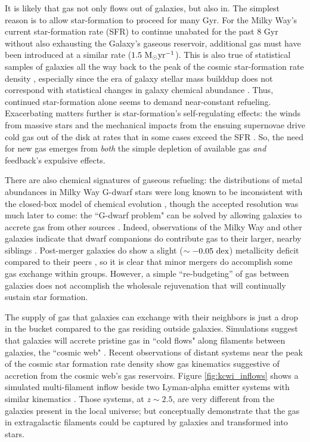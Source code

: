 It is likely that gas not only flows out of galaxies, but also in. The simplest reason is to allow star-formation to proceed for many Gyr. For the Milky Way's current star-formation rate (SFR) to continue unabated for the past 8 Gyr without also exhausting the Galaxy's gaseous reservoir, additional gas must have been introduced at a similar rate ($1.5 ~ {\rm M_{\odot} yr^{-1}}$). This is also true of statistical samples of galaxies all the way back to the peak of the cosmic star-formation rate density \citep{tacconi_2013}, especially since the era of galaxy stellar mass builddup does not correspond with statistical changes in galaxy chemical abundance \citep{erb_06_mzr-z2}. Thus, continued star-formation alone seems to demand near-constant refueling. Exacerbating matters further is star-formation's self-regulating effects: the winds from massive stars and the mechanical impacts from the ensuing supernovae drive cold gas out of the disk at rates that in some cases exceed the SFR \citep{chisholm_18_outflows, roberts-borsani_20_outflows}. So, the need for new gas emerges from \textit{both} the simple depletion of available gas \textit{and} feedback's expulsive effects.

There are also chemical signatures of gaseous refueling: the distributions of metal abundances in Milky Way G-dwarf stars were long known to be inconsistent with the closed-box model of chemical evolution \citep{vandenbergh_62_gdwarf}, though the accepted resolution was much later to come: the ``G-dwarf problem" can be solved by allowing galaxies to accrete gas from other sources \citep{fraternali_07}. Indeed, observations of the Milky Way and other galaxies indicate that dwarf companions do contribute gas to their larger, nearby siblings \citep{martinez-delgado_2010}. Post-merger galaxies do show a slight ($\sim -0.05 ~ {\rm dex}$) metallicity deficit compared to their peers \citep{bustamante_20_mergers}, so it is clear that minor mergers do accomplish some gas exchange within groups. However, a simple ``re-budgeting'' of gas between galaxies does not accomplish the wholesale rejuvenation that will continually sustain star formation.

The supply of gas that galaxies can exchange with their neighbors is just a drop in the bucket compared to the gas residing outside galaxies. Simulations suggest that galaxies will accrete pristine gas in ``cold flows" along filaments between galaxies, the ``cosmic web" \citep{silk_mamon_2012,sancisi08,cresci_2010_accretion}. Recent observations of distant systems near the peak of the cosmic star formation rate density show gas kinematics suggestive of accretion from the cosmic web's gas reservoirs. Figure \ref{fig:kcwi_inflows} shows a simulated multi-filament inflow beside two Lyman-alpha emitter systems with similar kinematics \citep{martin_19_kcwi-inflows}. Those systems, at $z \sim 2.5$, are very different from the galaxies present in the local universe; but conceptually demonstrate that the gas in extragalactic filaments could be captured by galaxies and transformed into stars.

